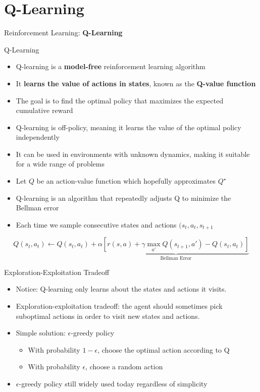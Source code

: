 \section{Q-Learning}
\begin{frame}{}
    \LARGE Reinforcement Learning: \textbf{Q-Learning}
\end{frame}

\begin{frame}[allowframebreaks]{Q-Learning}
    \begin{itemize}
        \item Q-learning is a \textbf{model-free} reinforcement learning algorithm
        \item It \textbf{learns the value of actions in states}, known as the \textbf{Q-value function}
        \item The goal is to find the optimal policy that maximizes the expected cumulative reward
        \item Q-learning is off-policy, meaning it learns the value of the optimal policy independently
        \item It can be used in environments with unknown dynamics, making it suitable for a wide range of problems
    \end{itemize}
\framebreak
    \begin{itemize}
        \item Let $Q$ be an action-value function which hopefully approximates $Q^{\star}$
        \item Q-learning is an algorithm that repeatedly adjusts Q to minimize the Bellman error
        \item Each time we sample consecutive states and actions $(s_t, a_t, s_{t+1}$
    \end{itemize}

    $$Q(s_t,a_t) \leftarrow Q(s_t,a_t) + \alpha \underbrace{\left [ r(s,a) + \gamma \max_{a'} Q(s_{t+1},a') - Q(s_t,a_t) \right ]}_{\text{Bellman Error}}$$
    
\end{frame}

\begin{frame}{Exploration-Exploitation Tradeoff}
\begin{itemize}
    \item Notice: Q-learning only learns about the states and actions it visits.
    \item Exploration-exploitation tradeoff: the agent should sometimes pick suboptimal actions in order to visit new states and actions.
    \item Simple solution: $\epsilon$-greedy policy
    \begin{itemize}
        \item With probability $1 - \epsilon$, choose the optimal action according to Q
        \item With probability $\epsilon$, choose a random action
    \end{itemize}
    \item $\epsilon$-greedy policy still widely used today regardless of simplicity
\end{itemize}
    
\end{frame}

